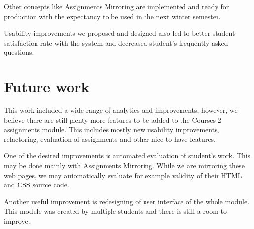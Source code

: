 Other concepts like Assignments Mirroring are implemented and ready for production with the expectancy to be used in the next winter semester.

Usability improvements we proposed and designed also led to better student satisfaction rate with the system and decreased student's frequently asked questions.

\section*{Future work}
This  work included a wide range of analytics and improvements, however, we believe there are still plenty more features to be added to the Courses 2 assignments module. This includes mostly new usability improvements, refactoring, evaluation of assignments and other nice-to-have features.

One of the desired improvements is automated evaluation of student's work. This may be done mainly with Assignments Mirroring. While we are mirroring these web pages, we may automatically evaluate for example validity of their HTML and CSS source code.

Another useful improvement is redesigning of user interface of the whole module. This module was created by multiple students and there is still a room to improve.
